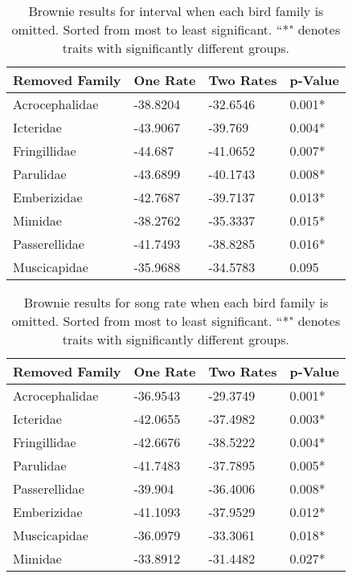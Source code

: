 \documentclass[a4paper,12pt]{article}
\begin{document}
\begin{table}[ht]
\caption{Brownie results for interval when each bird family is omitted.  Sorted from most to least significant.  ``*" denotes traits with significantly different groups.}
\centering
\begin{tabular}{llll}
  \hline
Removed Family & One Rate & Two Rates & p-Value \\ 
  \hline
Acrocephalidae & -38.8204 & -32.6546 & 0.001* \\ 
  Icteridae & -43.9067 & -39.769 & 0.004* \\ 
  Fringillidae & -44.687 & -41.0652 & 0.007* \\ 
  Parulidae & -43.6899 & -40.1743 & 0.008* \\ 
  Emberizidae & -42.7687 & -39.7137 & 0.013* \\ 
  Mimidae & -38.2762 & -35.3337 & 0.015* \\ 
  Passerellidae & -41.7493 & -38.8285 & 0.016* \\ 
  Muscicapidae & -35.9688 & -34.5783 & 0.095 \\ 
   \hline
\end{tabular}
\end{table}

\begin{table}[ht]
\caption{Brownie results for song rate when each bird family is omitted.  Sorted from most to least significant.  ``*" denotes traits with significantly different groups.}
\centering
\begin{tabular}{llll}
  \hline
Removed Family & One Rate & Two Rates & p-Value \\ 
  \hline
Acrocephalidae & -36.9543 & -29.3749 & 0.001* \\ 
  Icteridae & -42.0655 & -37.4982 & 0.003* \\ 
  Fringillidae & -42.6676 & -38.5222 & 0.004* \\ 
  Parulidae & -41.7483 & -37.7895 & 0.005* \\ 
  Passerellidae & -39.904 & -36.4006 & 0.008* \\ 
  Emberizidae & -41.1093 & -37.9529 & 0.012* \\ 
  Muscicapidae & -36.0979 & -33.3061 & 0.018* \\ 
  Mimidae & -33.8912 & -31.4482 & 0.027* \\ 
   \hline
\end{tabular}
\end{table}
\end{document}
